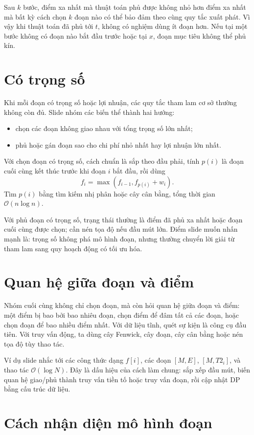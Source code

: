 \documentclass[11pt]{article}
\newcommand{\Oh}{\mathcal{O}}
\begin{document}
Sau \(k\) bước, điểm xa nhất mà thuật toán phủ được không nhỏ hơn điểm xa nhất
mà bất kỳ cách chọn \(k\) đoạn nào có thể bảo đảm theo cùng quy tắc xuất phát.
Vì vậy khi thuật toán đã phủ tới \(t\), không có nghiệm dùng ít đoạn hơn. Nếu
tại một bước không có đoạn nào bắt đầu trước hoặc tại \(x\), đoạn mục tiêu
không thể phủ kín.

\section{Có trọng số}

Khi mỗi đoạn có trọng số hoặc lợi nhuận, các quy tắc tham lam cơ sở thường
không còn đủ. Slide nhóm các biến thể thành hai hướng:
\begin{itemize}
  \item chọn các đoạn không giao nhau với tổng trọng số lớn nhất;
  \item phủ hoặc gán đoạn sao cho chi phí nhỏ nhất hay lợi nhuận lớn nhất.
\end{itemize}
Với chọn đoạn có trọng số, cách chuẩn là sắp theo đầu phải, tính
\(p(i)\) là đoạn cuối cùng kết thúc trước khi đoạn \(i\) bắt đầu, rồi dùng
\[
  f_i=\max(f_{i-1}, f_{p(i)}+w_i).
\]
Tìm \(p(i)\) bằng tìm kiếm nhị phân hoặc cây cân bằng, tổng thời gian
\(\Oh(n\log n)\).

Với phủ đoạn có trọng số, trạng thái thường là điểm đã phủ xa nhất hoặc đoạn
cuối cùng được chọn; cần nén tọa độ nếu đầu mút lớn. Điểm slide muốn nhấn
mạnh là: trọng số không phá mô hình đoạn, nhưng thường chuyển lời giải từ
tham lam sang quy hoạch động có tối ưu hóa.

\section{Quan hệ giữa đoạn và điểm}

Nhóm cuối cùng không chỉ chọn đoạn, mà còn hỏi quan hệ giữa đoạn và điểm: một
điểm bị bao bởi bao nhiêu đoạn, chọn điểm để đâm tất cả các đoạn, hoặc chọn
đoạn để bao nhiều điểm nhất. Với dữ liệu tĩnh, quét sự kiện là công cụ đầu
tiên. Với truy vấn động, ta dùng cây Fenwick, cây đoạn, cây cân bằng hoặc nén
tọa độ tùy thao tác.

Ví dụ slide nhắc tới các công thức dạng \(f[i]\), các đoạn \([M,E]\),
\([M,T2_i]\), và thao tác \(\Oh(\log N)\). Đây là dấu hiệu của cách làm chung:
sắp xếp đầu mút, biến quan hệ giao/phủ thành truy vấn tiền tố hoặc truy vấn
đoạn, rồi cập nhật DP bằng cấu trúc dữ liệu.

\section{Cách nhận diện mô hình đoạn}
\end{document}
